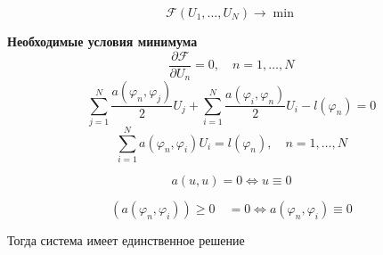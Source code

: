\documentclass[a4paper]{article}
\theoremstyle{definition}
\theoremstyle{remark}
\begin{document}
\[
    \mathcal{F}(U_1, \dots, U_N) \to \min
\]

\textbf{Необходимые условия минимума}
\[
  \frac{\partial \mathcal{F}}{\partial U_n} = 0, \quad n = 1, \dots, N
\]
\[
    \sum_{j=1}^{N} \frac{a(\varphi_n, \varphi_j)}{2} U_j + \sum_{i=1}^{N} 
  \frac{a(\varphi_i, \varphi_n)}{2} U_i - l(\varphi_n) = 0
\]
\[
    \sum_{i=1}^{N} a(\varphi_n, \varphi_i) U_i = l(\varphi_n), \quad n = 1, \dots, N
\]

\[
    a(u,u) = 0 \iff u \equiv 0
\]

\[
  (a(\varphi_n, \varphi_i)) \geq 0 \quad = 0 \iff a(\varphi_n, \varphi_i) \equiv 0
\]

Тогда система имеет единственное решение
\end{document}

